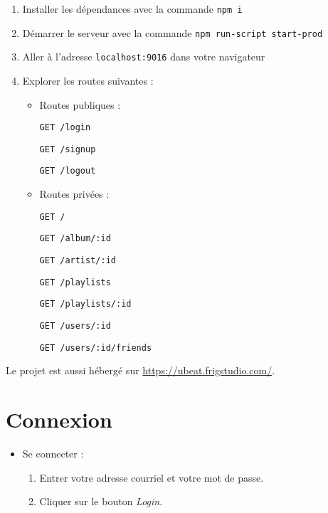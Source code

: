 \documentclass[12pt, letterpaper]{article}
\begin{document}
    \begin{enumerate}
        \item Installer les dépendances avec la commande \verb|npm i|
        \item Démarrer le serveur avec la commande \verb|npm run-script start-prod|
        \item Aller à l'adresse \verb|localhost:9016| dans votre navigateur
        \item Explorer les routes suivantes : \par
        \begin{itemize}
            \item Routes publiques : \par
            \verb|GET /login| \par
            \verb|GET /signup| \par
            \verb|GET /logout|

            \item Routes privées : \par
            \verb|GET /| \par
            \verb|GET /album/:id| \par
            \verb|GET /artist/:id| \par
            \verb|GET /playlists| \par
            \verb|GET /playlists/:id| \par
            \verb|GET /users/:id| \par
            \verb|GET /users/:id/friends|
        \end{itemize}
    \end{enumerate}

    \bigskip

    Le projet est aussi hébergé sur \url{https://ubeat.frigstudio.com/}.

    \section*{Connexion}
    \begin{itemize}
        \item Se connecter :
        \begin{enumerate}
            \item Entrer votre adresse courriel et votre mot de passe.
            \item Cliquer sur le bouton \textit{Login}.
        \end{enumerate}
    \end{itemize}
\end{document}
